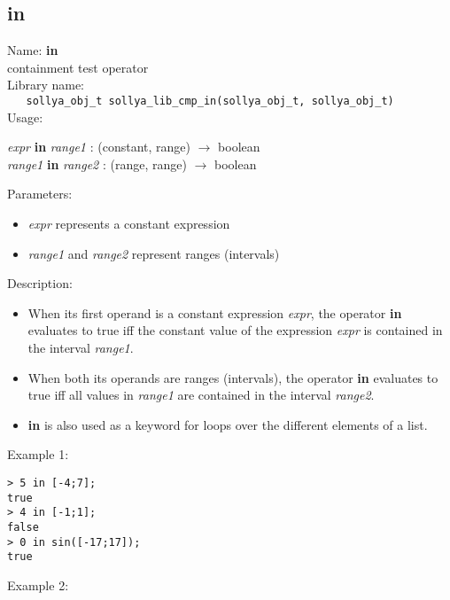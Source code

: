 \subsection{in}
\label{labin}
\noindent Name: \textbf{in}\\
\phantom{aaa}containment test operator\\[0.2cm]
\noindent Library name:\\
\verb|   sollya_obj_t sollya_lib_cmp_in(sollya_obj_t, sollya_obj_t)|\\[0.2cm]
\noindent Usage: 
\begin{center}
\emph{expr} \textbf{in} \emph{range1} : (\textsf{constant}, \textsf{range}) $\rightarrow$ \textsf{boolean}\\
\emph{range1} \textbf{in} \emph{range2} : (\textsf{range}, \textsf{range}) $\rightarrow$ \textsf{boolean}\\
\end{center}
Parameters: 
\begin{itemize}
\item \emph{expr} represents a constant expression
\item \emph{range1} and \emph{range2} represent ranges (intervals)
\end{itemize}
\noindent Description: \begin{itemize}

\item When its first operand is a constant expression \emph{expr},
   the operator \textbf{in} evaluates to true iff the constant value
   of the expression \emph{expr} is contained in the interval \emph{range1}.

\item When both its operands are ranges (intervals), 
   the operator \textbf{in} evaluates to true iff all values
   in \emph{range1} are contained in the interval \emph{range2}.

\item \textbf{in} is also used as a keyword for loops over the different
   elements of a list.
\end{itemize}
\noindent Example 1: 
\begin{center}\begin{minipage}{15cm}\begin{Verbatim}[frame=single]
> 5 in [-4;7];
true
> 4 in [-1;1];
false
> 0 in sin([-17;17]);
true
\end{Verbatim}
\end{minipage}\end{center}
\noindent Example 2: 
